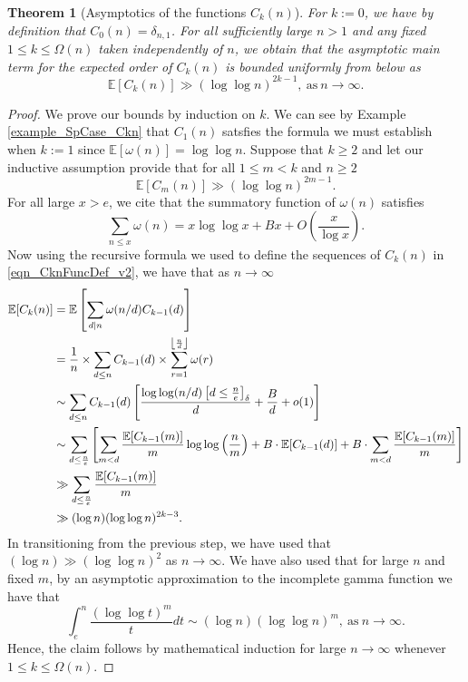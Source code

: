 \documentclass[11pt,reqno,a4letter]{article}
\numberwithin{figure}{section}
\numberwithin{table}{section}
\newcommand{\Iverson}[1]{\ensuremath{\left[#1\right]_{\delta}}}
\newcommand{\Floor}[2]{\ensuremath{\left\lfloor \frac{#1}{#2} \right\rfloor}}
\theoremstyle{plain}
\newtheorem{theorem}{Theorem}
\numberwithin{theorem}{section}
\theoremstyle{definition}
\newcommand{\NBRef}[1]{}
\begin{document}
\begin{theorem}[Asymptotics of the functions $C_k(n)$] 
\label{theorem_Ckn_GeneralAsymptoticsForms} 
For $k := 0$, we have by definition that $C_0(n) = \delta_{n,1}$. 
For all sufficiently large $n > 1$ and any fixed $1 \leq k \leq \Omega(n)$ 
taken independently of $n$, 
we obtain that the asymptotic main term for the expected order of 
$C_k(n)$ is bounded uniformly from below as 
\[
\mathbb{E}[C_k(n)] \gg (\log\log n)^{2k-1}, \mathrm{\ as\ }n \rightarrow \infty. 
\]
\end{theorem} 
\NBRef{A08-2020-04-26} 
\begin{proof} 
\label{proofOf_theorem_Ckn_GeneralAsymptoticsForms} 
We prove our bounds by induction on $k$. 
We can see by Example \ref{example_SpCase_Ckn} that $C_1(n)$ 
satsfies the formula we must establish when $k := 1$ since $\mathbb{E}[\omega(n)] = \log\log n$. 
Suppose that $k \geq 2$ and let our inductive assumption provide that for all $1 \leq m < k$ and $n \geq 2$
\[
\mathbb{E}[C_m(n)] \gg (\log\log n)^{2m-1}. 
\] 
For all large $x > e$, we cite that the summatory function of 
$\omega(n)$ satisfies \cite[\S 22.10]{HARDYWRIGHT} 
\[
\sum_{n \leq x} \omega(n) = x \log\log x + Bx + O\left(\frac{x}{\log x}\right). 
\]
Now using the recursive formula we used to define the sequences of $C_k(n)$ in 
\eqref{eqn_CknFuncDef_v2}, we have that as $n \rightarrow \infty$ 
\begin{align} 
\notag
\mathbb{E}[C_k(n)] & = \mathbb{E}\left[\sum_{d|n} \omega(n/d) C_{k-1}(d)\right] \\ 
\notag 
     & = \frac{1}{n} \times \sum_{d \leq n} C_{k-1}(d) \times \sum_{r=1}^{\Floor{n}{d}} \omega(r) \\ 
\notag 
     & \sim \sum_{d \leq n} C_{k-1}(d) \left[ 
     \frac{\log\log(n/d) \Iverson{d \leq \frac{n}{e}}}{d} + \frac{B}{d} + o(1)\right] \\ 
\label{eqn_proof_tag_ECkn_sum_steps_v3} 
     & \sim \sum_{d \leq \frac{n}{e}} \left[ 
     \sum_{m < d} \frac{\mathbb{E}[C_{k-1}(m)]}{m} \log\log\left(\frac{n}{m}\right) + 
     B \cdot \mathbb{E}[C_{k-1}(d)] + B \cdot \sum_{m < d} \frac{\mathbb{E}[C_{k-1}(m)]}{m} 
     \right] \\ 
\notag 
     & \gg \sum_{d \leq \frac{n}{e}} \frac{\mathbb{E}[C_{k-1}(m)]}{m} \\ 
\notag 
     & \gg (\log n) (\log\log n)^{2k-3}. 
\end{align} 
In transitioning from the previous step, we have used that 
$(\log n) \gg (\log\log n)^2$ as $n \rightarrow \infty$. We have also used that for large 
$n$ and fixed $m$, by an asymptotic approximation to the incomplete gamma function 
we have that 
\[
\int_{e}^{n} \frac{(\log\log t)^m}{t} dt \sim (\log n) (\log\log n)^{m}, 
     \mathrm{\ as\ } n \rightarrow \infty. 
\]
Hence, the claim follows by mathematical induction for large $n \rightarrow \infty$ whenever 
$1 \leq k \leq \Omega(n)$. 
\end{proof} 
\end{document}
